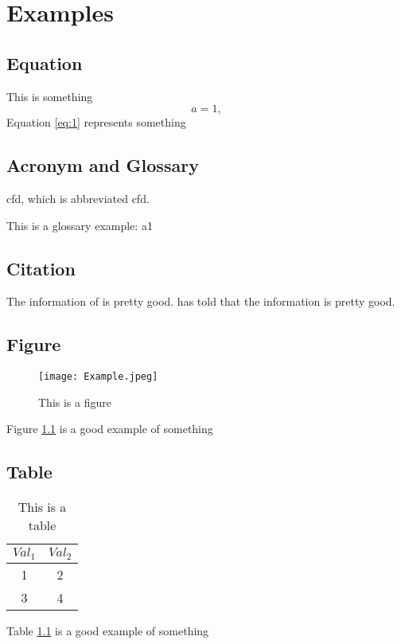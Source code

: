 \chapter{Examples}
\lipsum[1-2]

\section{Equation}
This is something
\begin{equation}
    a = 1,
\end{equation} \label{eq:1}
Equation \eqref{eq:1} represents something

\section{Acronym and Glossary}
\acrlong{cfd}, which is abbreviated \acrshort{cfd}. 

This is a glossary example: \gls{a1}

\newpage
\section{Citation}

The information of \cite{Lima_Thesis} is pretty good. \textcite{arnold1984stable} has told that the information is pretty good. \textcite{Lima_Thesis}

\section{Figure}
\begin{figure}[h]
    \centering
    \texttt{[image: Example.jpeg]}
    \caption{This is a figure}
    \label{fig:1}
\end{figure}

Figure \ref{fig:1} is a good example of something

\section{Table}
\begin{table}[h]
    \centering
    \caption{This is a table}
    \vspace*{2mm}
    \begin{tabular}{cc}
        \hline
        $Val_1$ & $Val_2$ \\
        \hline
        1 & 2 \\
        3 & 4 \\
        \hline
    \end{tabular}
    \label{tab:1}
\end{table}

Table \ref{tab:1} is a good example of something